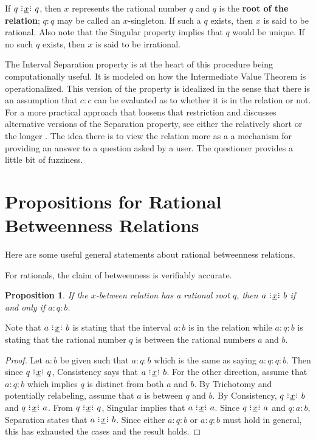\documentclass[12pt]{article}
\newtheorem{proposition}{Proposition}[section]
\begin{document}
If $q \xrel q$, then $x$ represents the rational number $q$ and $q$ is the \textbf{root of the relation}; $q:q$ may be called an $x$-singleton. If such a $q$ exists, then $x$ is said to be rational. Also note that the Singular property implies that $q$ would be unique. If no such $q$ exists, then $x$ is said to be irrational. 

The Interval Separation property is at the heart of this procedure being computationally useful. It is modeled on how the Intermediate Value Theorem is operationalized. This version of the property is idealized in the sense that there is an assumption that $c:c$ can be evaluated as to whether it is in the relation or not. For a more practical approach that loosens that restriction and discusses alternative versions of the Separation property, see either the relatively short \cite{taylor24oraclerbr} or the longer \cite{taylor23main}. The idea there is to view the relation more as a a mechanism for providing an answer to a question asked by a user. The questioner provides a little bit of fuzziness. 


\section{Propositions for Rational Betweenness Relations}

Here are some useful general statements about rational betweenness relations. 

For rationals, the claim of betweenness is verifiably accurate. 

\begin{proposition}\label{br:rooted}
    If the $x$-between relation has a rational root $q$, then $a \xrel b$ if and only if $a : q : b$.
\end{proposition}

Note that $a \xrel b$ is stating that the interval $a:b$ is in the relation while $a:q:b$ is stating that the rational number $q$ is between the rational numbers $a$ and $b$.

\begin{proof}
    Let $a : b$ be given such that $a : q : b$ which is the same as saying $a:q:q:b$. Then since $q \xrel q$, Consistency says that $a \xrel b$. For the other direction, assume that \sout{$a:q:b$} which implies $q$ is distinct from both $a$ and $b$. By Trichotomy and potentially relabeling, assume that $a$ is between $q$ and $b$. By Consistency, $q \xrel b$ and $q\xrel a$.  From $q \xrel q$, Singular implies that \sout{$a \xrel a$}. Since $q \xrel a$ and $q:a:b$, Separation states that \sout{$ a \xrel b$}. Since either $a:q:b$ or \sout{$a:q:b$} must hold in general, this has exhausted the cases and the result holds.  
\end{proof}
\end{document}

